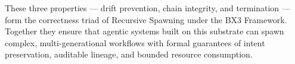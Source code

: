 These three properties — drift prevention, chain integrity, and
termination — form the correctness triad of Recursive Spawning under
the BX3 Framework. Together they ensure that agentic systems built on
this substrate can spawn complex, multi-generational workflows with
formal guarantees of intent preservation, auditable lineage, and
bounded resource consumption.
